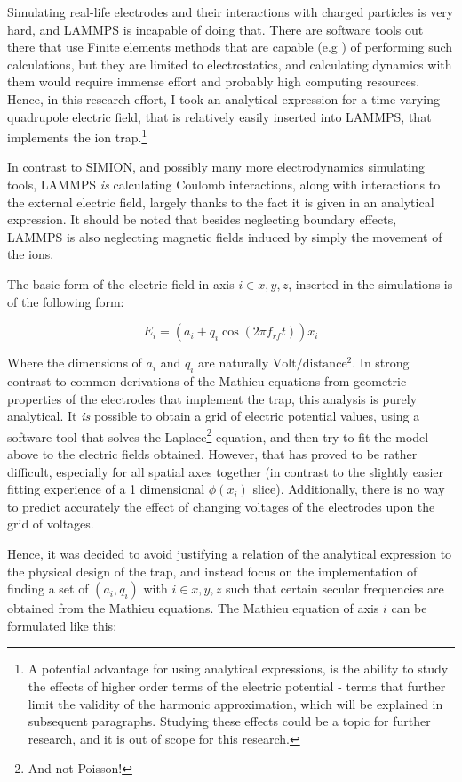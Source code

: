 Simulating real-life electrodes and their interactions with charged particles is very hard, and LAMMPS is incapable of doing that. There are software tools out there that use Finite elements methods that are capable (e.g \cite{FEniCS}) of performing such calculations, but they are limited to electrostatics, and calculating dynamics with them would require immense effort and probably high computing resources. Hence, in this research effort, I took an analytical expression for a time varying quadrupole electric field, that is relatively easily inserted into LAMMPS, that implements the ion trap.\footnote{A potential advantage for using analytical expressions, is the ability to study the effects of higher order terms of the electric potential - terms that further limit the validity of the harmonic approximation, which will be explained in subsequent paragraphs. Studying these effects could be a topic for further research, and it is out of scope for this research.}

In contrast to SIMION\cite{SIMION}, and possibly many more electrodynamics simulating tools, LAMMPS \emph{is} calculating Coulomb interactions, along with interactions to the external electric field, largely thanks to the fact it is given in an analytical expression. It should be noted that besides neglecting boundary effects, LAMMPS is also neglecting magnetic fields induced by simply the movement of the ions.

The basic form of the electric field in axis $i \in {x,y,z}$, inserted in the simulations is of the following form:

$$ E_i = (a_i + q_i \cos(2\pi f_{rf} t)) x_i$$

Where the dimensions of $a_i$ and $q_i$ are naturally $\mathrm{Volt}/\mathrm{distance^2}$. In strong contrast to common derivations of the Mathieu equations from geometric properties of the electrodes that implement the trap, this analysis is purely analytical. It \emph{is} possible to obtain a grid of electric potential values, using a software tool that solves the Laplace\footnote{And not Poisson!} equation, and then try to fit the model above to the electric fields obtained. However, that has proved to be rather difficult, especially for all spatial axes together (in contrast to the slightly easier fitting experience of a 1 dimensional $\phi(x_i)$ slice). Additionally, there is no way to predict accurately the effect of changing voltages of the electrodes upon the grid of voltages.

Hence, it was decided to avoid justifying a relation of the analytical expression to the physical design of the trap, and instead focus on the implementation of finding a set of $(a_i, q_i)$ with $i \in {x,y,z}$ such that certain secular frequencies are obtained from the Mathieu equations. The Mathieu equation of axis $i$ can be formulated like this:

